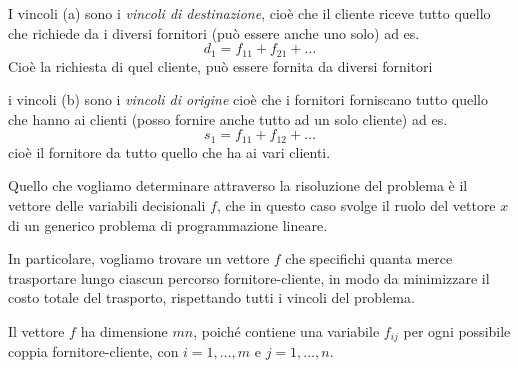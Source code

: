I vincoli (a) sono i \emph{vincoli di destinazione}, cioè che il cliente riceve tutto quello che richiede da i diversi fornitori (può essere anche uno solo) ad es.
\[
d_1 = f_{11} + f_{21} + \dots
\]
Cioè la richiesta di quel cliente, può essere fornita da diversi fornitori


i vincoli (b) sono i \emph{vincoli di origine} cioè che i fornitori forniscano tutto quello che hanno ai clienti (posso fornire anche tutto ad un solo cliente) ad es. 
\[
s_1 = f_{11} + f_{12} + \dots
\]
cioè il fornitore da tutto quello che ha ai vari clienti.




Quello che vogliamo determinare attraverso la risoluzione del problema è il vettore delle variabili decisionali $f$, che in questo caso svolge il ruolo del vettore $x$ di un generico problema di programmazione lineare.

In particolare, vogliamo trovare un vettore $f$ che specifichi quanta merce trasportare lungo ciascun percorso fornitore-cliente, in modo da minimizzare il costo totale del trasporto, rispettando tutti i vincoli del problema.

Il vettore $f$ ha dimensione $mn$, poiché contiene una variabile $f_{ij}$ per ogni possibile coppia fornitore-cliente, con $i=1,\dots,m$ e $j=1,\dots,n$.



\newpage


